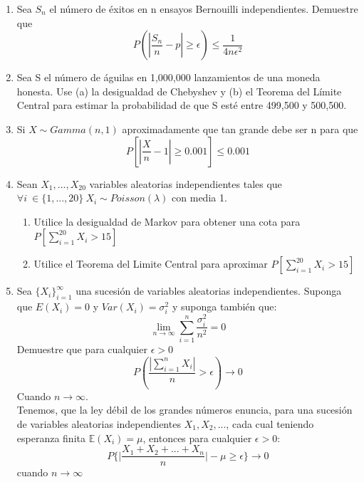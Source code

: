 \documentclass[11pt,a4paper]{report}
\begin{document}
\begin{enumerate}
		\item{
		Sea $S_{n}$ el número de éxitos en n ensayos Bernouilli independientes. Demuestre que $$P(|\frac{S_{n}}{n}-p|\geq \epsilon)\leq \frac{1}{4n\epsilon^2}$$
			
		}

		\item{
		Sea S el número de águilas en 1,000,000 lanzamientos de una moneda honesta. Use (a) la desigualdad de Chebyshev y (b) el Teorema del Límite Central para estimar la probabilidad de que S esté entre 499,500 y 500,500.
		}

		\item{
			
          Si $X \sim Gamma(n,1)$ aproximadamente que tan grande debe ser n para que 
          $$P[|\frac{X}{n}-1|\geq 0.001]\leq 0.001$$
		}

		\item{
			Sean $X_{1},...,X_{20}$ variables aleatorias independientes tales que $\forall i \ \in \lbrace 1,...,20 \rbrace \ X_{i} \sim Poisson(\lambda) $ con media 1.\\
			\begin{enumerate}
			    \item{Utilice la desigualdad de Markov para obtener una cota para $P[\sum_{i=1}^{20}X_{i}>15]$} 
			    \item{Utilice el Teorema del Limite Central para aproximar $P[\sum_{i=1}^{20}X_{i}>15]$}
			\end{enumerate}
		}

		\item{
	    Sea $\lbrace X_{i} \rbrace _{i=1}^{\infty}$ una sucesión de variables aleatorias independientes. Suponga que $E(X_{i})=0$ y $Var(X_{i})=\sigma_{i}^{2}$ y suponga también que:
	            $$\lim_{n \rightarrow \infty}\sum_{i=1}^{n}\frac{\sigma_{i}^{2}}{n^2}=0$$
	   Demuestre que para cualquier $\epsilon >0$
	                $$P(\frac{|\sum_{i=1}^{n}X_{i}|}{n}>\epsilon)\rightarrow 0$$
	   Cuando $n\rightarrow \infty$.\\

	   Tenemos, que la ley débil de los grandes números enuncia, para una 
	   sucesión de variables aleatorias independientes $X_1, X_2, ...$, cada 
	   cual teniendo esperanza finita $\mathbb{E}(X_i) = \mu$, entonces para 
	   cualquier $\epsilon > 0$:
			$$ P\Big\{ \Big| \frac{X_1 + X_2 + ... + X_n}{n} \Big| - \mu \geq 
				\epsilon \Big\} \rightarrow 0$$
		cuando $n \rightarrow \infty$

}
\end{enumerate}
\end{document}
